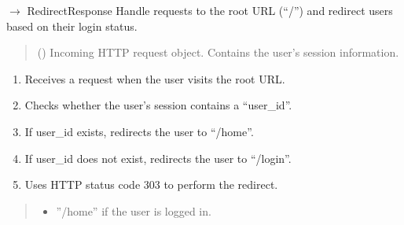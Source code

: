 \documentclass[letterpaper,10pt,english]{sphinxmanual}
\begin{document}
\begin{fulllineitems}
\label{\detokenize{modules:app.auth.root}}
\pysigstartsignatures
\pysiglinewithargsret
{}
{}
{{ $\rightarrow$ RedirectResponse}}
\pysigstopsignatures
\sphinxAtStartPar
Handle requests to the root URL (“/”) and redirect users
based on their login status.
\begin{quote}\begin{description}
\sphinxAtStartPar
{} () \textendash{} Incoming HTTP request object.
Contains the user’s session information.

\end{description}\end{quote}
\begin{description}
\begin{enumerate}
%
\item {} 
\sphinxAtStartPar
Receives a request when the user visits the root URL.

\item {} 
\sphinxAtStartPar
Checks whether the user’s session contains a “user\_id”.

\item {} 
\sphinxAtStartPar
If user\_id exists, redirects the user to “/home”.

\item {} 
\sphinxAtStartPar
If user\_id does not exist, redirects the user to “/login”.

\item {} 
\sphinxAtStartPar
Uses HTTP status code 303 to perform the redirect.

\end{enumerate}

\end{description}
\begin{quote}\begin{description}
\sphinxAtStartPar
\begin{description}
\begin{itemize}
\item {} 
\sphinxAtStartPar
”/home” if the user is logged in.


\end{itemize}
\end{description}
\end{description}
\end{quote}
\end{fulllineitems}
\end{document}
